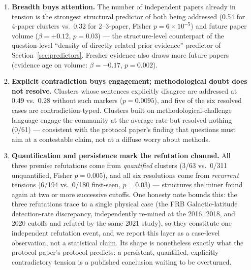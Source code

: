 \documentclass[11pt]{article}
\begin{document}
\begin{enumerate}
  \item \textbf{Breadth buys attention.} The number of independent
    papers already in tension is the strongest structural predictor of
    both being addressed (0.54 for 4-paper clusters vs.\ 0.32 for
    2--3-paper, Fisher $p=6\times10^{-5}$) and future paper volume
    ($\beta=+0.12$, $p=0.03$) --- the structure-level counterpart of
    the question-level ``density of directly related prior evidence''
    predictor of Section~\ref{sec:predictors}. Fresher evidence also draws more future
    papers (evidence age on volume: $\beta=-0.17$, $p=0.002$).
  \item \textbf{Explicit contradiction buys engagement; methodological
    doubt does not resolve.} Clusters whose sentences explicitly
    disagree are addressed at 0.49 vs.\ 0.28 without such markers
    ($p=0.0095$), and five of the six resolved cases are
    contradiction-typed. Clusters built on methodological-challenge
    language engage the community at the average rate but resolved
    nothing (0/61) --- consistent with the protocol paper's finding that questions
    must aim at a contestable claim, not at a diffuse worry about
    methods.
  \item \textbf{Quantification and persistence mark the refutation
    channel.} All three premise refutations come from
    \emph{quantified} clusters (3/63 vs.\ 0/311 unquantified, Fisher
    $p=0.005$), and all six resolutions come from \emph{recurrent}
    tensions (6/194 vs.\ 0/180 first-seen, $p=0.03$) --- structures the
    miner found again at two or more successive cutoffs. One honesty
    note bounds this: the three refutations trace to a single physical
    case (the FRB Galactic-latitude detection-rate discrepancy,
    independently re-mined at the 2016, 2018, and 2020 cutoffs and
    refuted by the same 2021 study), so they constitute one independent
    refutation event, and we report this layer as a case-level
    observation, not a statistical claim. Its shape is nonetheless
    exactly what the protocol paper's protocol predicts: a persistent, quantified,
    explicitly contradictory tension is a published conclusion waiting
    to be overturned.
\end{enumerate}
\end{document}
